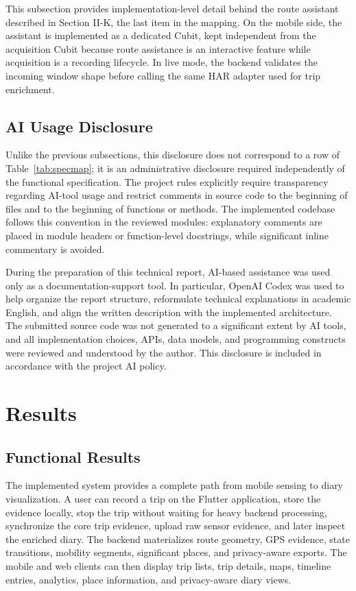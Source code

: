 \documentclass[conference,a4paper]{IEEEtran}
\begin{document}
This subsection provides implementation-level detail behind the route assistant described in Section II-K, the last item in the mapping. On the mobile side, the assistant is implemented as a dedicated Cubit, kept independent from the acquisition Cubit because route assistance is an interactive feature while acquisition is a recording lifecycle. In live mode, the backend validates the incoming window shape before calling the same HAR adapter used for trip enrichment.

\subsection{AI Usage Disclosure}

Unlike the previous subsections, this disclosure does not correspond to a row of Table~\ref{tab:specmap}; it is an administrative disclosure required independently of the functional specification. The project rules explicitly require transparency regarding AI-tool usage and restrict comments in source code to the beginning of files and to the beginning of functions or methods. The implemented codebase follows this convention in the reviewed modules: explanatory comments are placed in module headers or function-level docstrings, while significant inline commentary is avoided.

During the preparation of this technical report, AI-based assistance was used only as a documentation-support tool. In particular, OpenAI Codex was used to help organize the report structure, reformulate technical explanations in academic English, and align the written description with the implemented architecture. The submitted source code was not generated to a significant extent by AI tools, and all implementation choices, APIs, data models, and programming constructs were reviewed and understood by the author. This disclosure is included in accordance with the project AI policy.

\section{Results}

\subsection{Functional Results}

The implemented system provides a complete path from mobile sensing to diary visualization. A user can record a trip on the Flutter application, store the evidence locally, stop the trip without waiting for heavy backend processing, synchronize the core trip evidence, upload raw sensor evidence, and later inspect the enriched diary. The backend materializes route geometry, GPS evidence, state transitions, mobility segments, significant places, and privacy-aware exports. The mobile and web clients can then display trip lists, trip details, maps, timeline entries, analytics, place information, and privacy-aware diary views.
\end{document}
